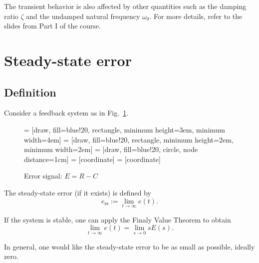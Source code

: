 \documentclass[a4paper,11pt]{report}
\theoremstyle{definition}
\newcommand{\sse}{\mathrm{ss}}
\begin{document}
The transient behavior is also affected by other quantities such as
the damping ratio $\zeta$ and the undamped natural frequency
$\omega_0$. For more details, refer to the slides from Part I of the
course.

\section{Steady-state error}

\subsection{Definition}

Consider a feedback system as in Fig.~\ref{fig:sse}.

\begin{figure}[H]
  \centering
   = [draw, fill=blue!20, rectangle, minimum height=3em, minimum width=4em]
   = [draw, fill=blue!20, rectangle, minimum height=2em, minimum width=2em]
   = [draw, fill=blue!20, circle, node distance=1cm]
   = [coordinate]
   = [coordinate]
  \caption{Error signal: $E=R-C$}
  \label{fig:sse}
\end{figure}

The steady-state error (if it exists) is defined by
\begin{equation}
  \label{eq:sse}
  e_\sse := \lim_{t\to\infty} e(t).
\end{equation}

If the system is stable, one can apply the Finaly Value Theorem to obtain
\[
\lim_{t\to\infty} e(t) = \lim_{s\to 0} sE(s).
\]

In general, one would like the steady-state error to be as small as
possible, ideally zero.
\end{document}
